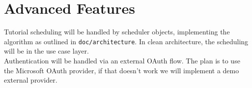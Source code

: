 \section{Advanced Features}
  
Tutorial scheduling will be handled by scheduler objects, implementing the algorithm as outlined in \verb|doc/architecture|. In clean architecture, the scheduling will be in the use case layer.\\

Authentication will be handled via an external OAuth flow. The plan is to use the Microsoft OAuth provider, if that doesn't work we will implement a demo external provider. 

